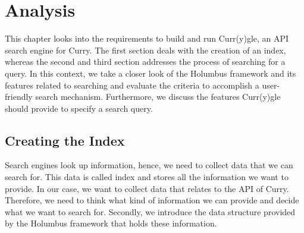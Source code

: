 \documentclass[%
	latex,%
	a4paper,%
	oneside,%
	chapterprefix,%
	headsepline,%
	12pt%
]{scrbook}
\begin{document}

\chapter{Analysis}\label{analysis}
This chapter looks into the requirements to build and run Curr(y)gle,
an API search engine for Curry. %
The first section deals with the creation of an index, whereas the
second and third section addresses the process of searching for a
query. %
In this context, we take a closer look of the Holumbus framework and
its features related to searching and evaluate the criteria to
accomplish a user-friendly search mechanism. %
Furthermore, we discuss the features Curr(y)gle should provide to
specify a search query. %






\section{Creating the Index}
Search engines look up information, hence, we need to collect data
that we can search for. %
This data is called index and stores all the information we want to
provide. %
In our case, we want to collect data that relates to the API of
Curry. %
Therefore, we need to think what kind of information we can provide
and decide what we want to search for. %
Secondly, we introduce the data structure provided by the Holumbus
framework that holds these information.\\ %


\end{document}
